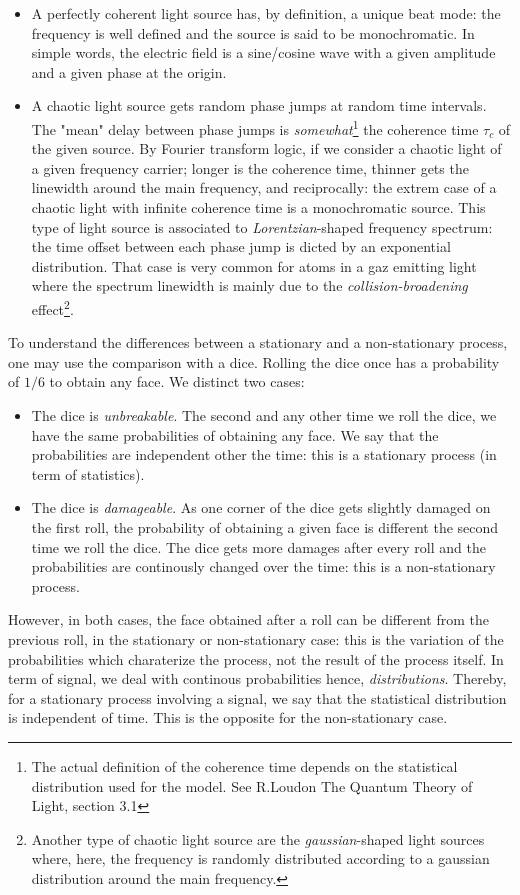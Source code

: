 \documentclass[11pt]{report}
\begin{document}
\begin{itemize}
	\item A perfectly coherent light source has, by definition, a unique beat mode: the frequency is well defined and the source is said to be monochromatic. In simple words, the electric field is a sine/cosine wave with a given amplitude and a given phase at the origin.
	\item A chaotic light source gets random phase jumps at random time intervals. The "mean" delay between phase jumps is \textit{somewhat}\footnote{The actual definition of the coherence time depends on the statistical distribution used for the model. See R.Loudon The Quantum Theory of Light, section 3.1} the coherence time $\tau_c$ of the given source. By Fourier transform logic, if we consider a chaotic light of a given frequency carrier; longer is the coherence time, thinner gets the linewidth around the main frequency, and reciprocally: the extrem case of a chaotic light with infinite coherence time is a monochromatic source. This type of light source is associated to \textit{Lorentzian}-shaped frequency spectrum: the time offset between each phase jump is dicted by an exponential distribution. That case is very common for atoms in a gaz emitting light where the spectrum linewidth is mainly due to the \textit{collision-broadening} effect\footnote{Another type of chaotic light source are the \textit{gaussian}-shaped light sources where, here, the frequency is randomly distributed according to a gaussian distribution around the main frequency.}.
\end{itemize}

To understand the differences between a stationary and a non-stationary process, one may use the comparison with a dice. Rolling the dice once has a probability  of $1/6$ to obtain any face. We distinct two cases:
\begin{itemize}
	\item The dice is \textit{unbreakable}. The second and any other time we roll the dice, we have the same probabilities of obtaining any face. We say that the probabilities are independent other the time: this is a stationary process (in term of statistics).
	\item The dice is \textit{damageable}. As one corner of the dice gets slightly damaged on the first roll, the probability of obtaining a given face is different the second time we roll the dice. The dice gets more damages after every roll and the probabilities are continously changed over the time: this is a non-stationary process.
\end{itemize}
However, in both cases, the face obtained after a roll can be different from the previous roll, in the stationary or non-stationary case: this is the variation of the probabilities which charaterize the process, not the result of the process itself. In term of signal, we deal with continous probabilities hence, \textit{distributions}. Thereby, for a stationary process involving a signal, we say that the statistical distribution is independent of time. This is the opposite for the non-stationary case.
\end{document}
